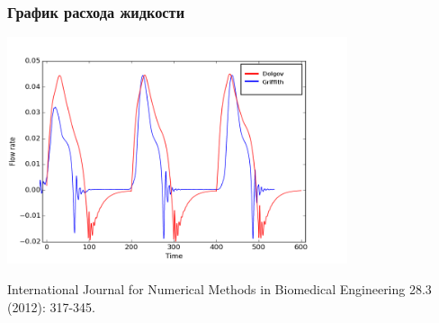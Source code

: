 \documentclass[14pt]{beamer}
\begin{document}
\begin{frame}
\frametitle{График расхода жидкости}
    \begin{center}
        \includegraphics[width=10cm]{flow_rate_comparison_with_legend.png}
    \end{center}

    \begin{adjustbox}{max totalsize={1.0\textwidth}{.7\textheight},center}
        {\scriptsize
            International Journal for Numerical Methods in Biomedical Engineering 28.3 (2012): 317-345.
        }
    \end{adjustbox}
\end{frame}
\end{document}
